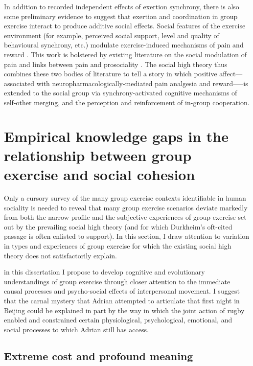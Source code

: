 \begin{CJK}{UTF8}{gbsn}
In addition to recorded independent effects of exertion synchrony, there is also some preliminary evidence to suggest that exertion and coordination in group exercise interact to produce additive social effects.  Social features of the exercise environment (for example, perceived social support, level and quality of behavioural synchrony, etc.) modulate exercise-induced mechanisms of pain and reward \citep{Cohen2009,Sullivan2014,Tarr2015,Davis2015,Weinstein2016}. This work is bolstered by existing literature on the social modulation of pain \citep{Eisenberger2012a} and links between pain and prosociality \citep{Bastian2014a}.  The social high theory thus combines these two bodies of literature to tell a story in which positive affect---associated with neuropharmacologically-mediated pain analgesia and reward—--is extended to the social group via synchrony-activated cognitive mechanisms of self-other merging, and the perception and reinforcement of in-group cooperation.

\section{Empirical knowledge gaps in the relationship between group exercise and social cohesion\label{sect:empKnowGaps}}
Only a cursory survey of the many group exercise contexts identifiable in human sociality is needed to reveal that many group exercise scenarios deviate markedly from both the narrow profile and the subjective experiences of group exercise set out by the prevailing social high theory (and for which Durkheim's oft-cited passage is often enlisted to support). In this section, I draw attention to variation in types and experiences of group exercise for which the existing social high theory does not satisfactorily explain.

in this dissertation I propose to develop cognitive and evolutionary understandings of group exercise through closer attention to the immediate causal processes and psycho-social effects of interpersonal movement.  I suggest that the carnal mystery that Adrian attempted to articulate that first night in Beijing could be explained in part by the way in which the joint action of rugby enabled and constrained certain physiological, psychological, emotional, and social processes to which Adrian still has access.


\subsection{Extreme cost and profound meaning\label{sect:linkCostMeaning}}


\end{CJK}
